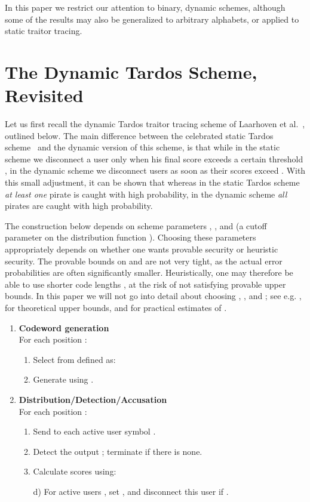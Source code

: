 \documentclass[10pt,a4paper,twocolumn]{article}
\begin{document}
In this paper we restrict our attention to binary, dynamic schemes, although some of the results may also be generalized to arbitrary alphabets, or applied to static traitor tracing.




\section{The Dynamic Tardos Scheme, Revisited}
\label{sec:tardos}

Let us first recall the dynamic Tardos traitor tracing scheme of Laarhoven et al.~\cite{laarhoven13tit}, outlined below. The main difference between the celebrated static Tardos scheme~\cite{tardos03} and the dynamic version of this scheme, is that while in the static scheme we disconnect a user only when his final score exceeds a certain threshold , in the dynamic scheme we disconnect users as soon as their scores exceed . With this small adjustment, it can be shown that whereas in the static Tardos scheme \textit{at least one} pirate is caught with high probability, in the dynamic scheme \textit{all} pirates are caught with high probability.

The construction below depends on scheme parameters , , and  (a cutoff parameter on the distribution function ). Choosing these parameters appropriately depends on whether one wants provable security or heuristic security. The provable bounds on  and  are not very tight, as the actual error probabilities are often significantly smaller. Heuristically, one may therefore be able to use shorter code lengths , at the risk of not satisfying provable upper bounds. In this paper we will not go into detail about choosing , , and ; see e.g. \cite{laarhoven13tit}, \cite{blayer08,laarhoven12dcc,skoric13} for theoretical upper bounds, and \cite{furon09,simone12} for practical estimates of .

\begin{enumerate}
	\item \textbf{Codeword generation} \\
	For each position :
	\begin{enumerate}
		\item Select  from  defined as:
		
		\item Generate  using .
	\end{enumerate}
	\item \textbf{Distribution/Detection/Accusation} \\
	For each position :
	\begin{enumerate}
		\item Send to each active user  symbol .
		\item Detect the output ; terminate if there is none.
		\item Calculate scores  using:
	\end{enumerate}
		
	\begin{enumerate}
		\item[d)] For active users , set , and disconnect this user if .
	\end{enumerate}
\end{enumerate}
\end{document}
